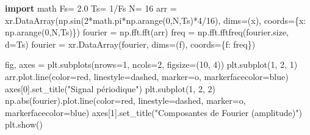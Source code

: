 \documentclass[
]{article}
\newenvironment{Shaded}{}{}
\newcommand{\BuiltInTok}[1]{\textcolor[rgb]{0.00,0.50,0.00}{#1}}
\newcommand{\DecValTok}[1]{\textcolor[rgb]{0.25,0.63,0.44}{#1}}
\newcommand{\FloatTok}[1]{\textcolor[rgb]{0.25,0.63,0.44}{#1}}
\newcommand{\ImportTok}[1]{\textcolor[rgb]{0.00,0.50,0.00}{\textbf{#1}}}
\newcommand{\NormalTok}[1]{#1}
\newcommand{\OperatorTok}[1]{\textcolor[rgb]{0.40,0.40,0.40}{#1}}
\newcommand{\StringTok}[1]{\textcolor[rgb]{0.25,0.44,0.63}{#1}}
\begin{document}
\label{98b21fca}
\label{cb5}
\begin{Shaded}
\begin{Highlighting}[]
\ImportTok{import}\NormalTok{ math}
\NormalTok{Fs}\OperatorTok{=} \FloatTok{2.0}
\NormalTok{Ts}\OperatorTok{=} \DecValTok{1}\OperatorTok{/}\NormalTok{Fs}
\NormalTok{N}\OperatorTok{=} \DecValTok{16}
\NormalTok{arr }\OperatorTok{=}\NormalTok{ xr.DataArray(np.sin(}\DecValTok{2}\OperatorTok{*}\NormalTok{math.pi}\OperatorTok{*}\NormalTok{np.arange(}\DecValTok{0}\NormalTok{,N,Ts)}\OperatorTok{*}\DecValTok{4}\OperatorTok{/}\DecValTok{16}\NormalTok{),}
\NormalTok{                   dims}\OperatorTok{=}\NormalTok{(}\StringTok{\textquotesingle{}x\textquotesingle{}}\NormalTok{), coords}\OperatorTok{=}\NormalTok{\{}\StringTok{\textquotesingle{}x\textquotesingle{}}\NormalTok{: np.arange(}\DecValTok{0}\NormalTok{,N,Ts)\})}
\NormalTok{fourier }\OperatorTok{=}\NormalTok{ np.fft.fft(arr)}
\NormalTok{freq }\OperatorTok{=}\NormalTok{ np.fft.fftfreq(fourier.size, d}\OperatorTok{=}\NormalTok{Ts)}
\NormalTok{fourier }\OperatorTok{=}\NormalTok{ xr.DataArray(fourier,}
\NormalTok{                   dims}\OperatorTok{=}\NormalTok{(}\StringTok{\textquotesingle{}f\textquotesingle{}}\NormalTok{), coords}\OperatorTok{=}\NormalTok{\{}\StringTok{\textquotesingle{}f\textquotesingle{}}\NormalTok{: freq\})}

\NormalTok{fig, axes }\OperatorTok{=}\NormalTok{ plt.subplots(nrows}\OperatorTok{=}\DecValTok{1}\NormalTok{, ncols}\OperatorTok{=}\DecValTok{2}\NormalTok{, figsize}\OperatorTok{=}\NormalTok{(}\DecValTok{10}\NormalTok{, }\DecValTok{4}\NormalTok{))}
\NormalTok{plt.subplot(}\DecValTok{1}\NormalTok{, }\DecValTok{2}\NormalTok{, }\DecValTok{1}\NormalTok{)}
\NormalTok{arr.plot.line(color}\OperatorTok{=}\StringTok{\textquotesingle{}red\textquotesingle{}}\NormalTok{, linestyle}\OperatorTok{=}\StringTok{\textquotesingle{}dashed\textquotesingle{}}\NormalTok{, marker}\OperatorTok{=}\StringTok{\textquotesingle{}o\textquotesingle{}}\NormalTok{, markerfacecolor}\OperatorTok{=}\StringTok{\textquotesingle{}blue\textquotesingle{}}\NormalTok{)}
\NormalTok{axes[}\DecValTok{0}\NormalTok{].set\_title(}\StringTok{"Signal périodique"}\NormalTok{)}
\NormalTok{plt.subplot(}\DecValTok{1}\NormalTok{, }\DecValTok{2}\NormalTok{, }\DecValTok{2}\NormalTok{)}
\NormalTok{np.}\BuiltInTok{abs}\NormalTok{(fourier).plot.line(color}\OperatorTok{=}\StringTok{\textquotesingle{}red\textquotesingle{}}\NormalTok{, linestyle}\OperatorTok{=}\StringTok{\textquotesingle{}dashed\textquotesingle{}}\NormalTok{, marker}\OperatorTok{=}\StringTok{\textquotesingle{}o\textquotesingle{}}\NormalTok{, markerfacecolor}\OperatorTok{=}\StringTok{\textquotesingle{}blue\textquotesingle{}}\NormalTok{)}
\NormalTok{axes[}\DecValTok{1}\NormalTok{].set\_title(}\StringTok{"Composantes de Fourier (amplitude)"}\NormalTok{)}
\NormalTok{plt.show()}
\end{Highlighting}
\end{Shaded}
\end{document}
